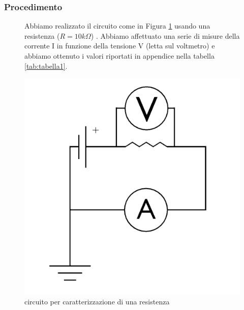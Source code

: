 \documentclass{article}
\begin{document}
\subsubsection{Procedimento}

\begin{figure}[h]
    \begin{minipage}{0.7\textwidth} %
        Abbiamo realizzato il circuito come in Figura \ref{circuito:1} usando una resistenza ($R=10k\Omega$) . Abbiamo affettuato una serie di misure della corrente I in funzione della tensione V (letta sul voltmetro) e abbiamo ottenuto i valori riportati in appendice nella tabella \ref{tab:tabella1}.
    \end{minipage}
    \hfill %
    \begin{minipage}{0.25\textwidth} %
        \centering
        \includegraphics[width=\linewidth]{../images/circuito1.png} %
        \caption{circuito per caratterizzazione di una resistenza}
        \label{circuito:1}
    \end{minipage}
\end{figure}

\newpage
\end{document}

